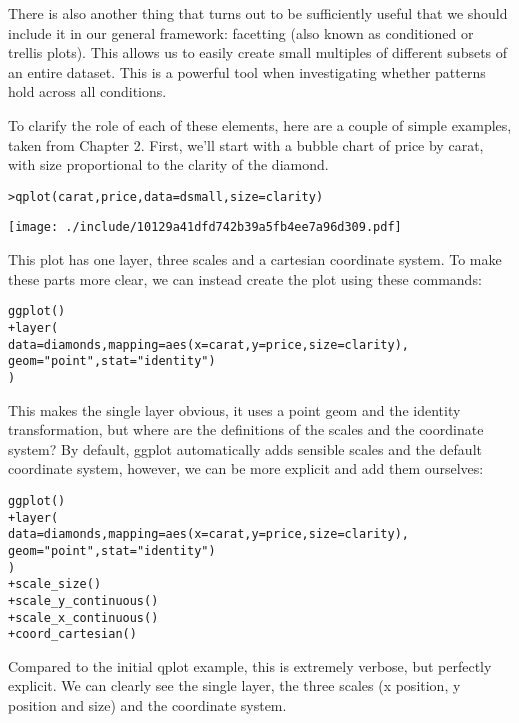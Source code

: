 There is also another thing that turns out to be sufficiently useful that we should include it in our general framework: facetting (also known as conditioned or trellis plots). This allows us to easily create small multiples of different subsets of an entire dataset. This is a powerful tool when investigating whether patterns hold across all conditions.

To clarify the role of each of these elements, here are a couple of simple examples, taken from Chapter 2.  First, we'll start with a bubble chart of price by carat, with size proportional to the clarity of the diamond.

\begin{alltt}
> qplot(carat, price, data = dsmall, size = clarity)
\end{alltt}
\texttt{[image: ./include/10129a41dfd742b39a5fb4ee7a96d309.pdf]}
\begin{alltt}

\end{alltt}

This plot has one layer, three scales and a cartesian coordinate system.  To make these parts more clear, we can instead create the plot using these commands:

\begin{alltt}
ggplot()
+ layer(
    data = diamonds, mapping = aes(x = carat, y = price, size = clarity),
    geom = "point", stat = "identity")
  )
\end{alltt}

This makes the single layer obvious, it uses a point geom and the identity transformation, but where are the definitions of the scales and the coordinate system?  By default, ggplot automatically adds sensible scales and the default coordinate system, however, we can be more explicit and add them ourselves:

\begin{alltt}
ggplot() 
+ layer(
    data = diamonds, mapping = aes(x = carat, y = price, size = clarity),
    geom = "point", stat = "identity")
  )
+ scale_size()
+ scale_y_continuous()
+ scale_x_continuous()
+ coord_cartesian()
\end{alltt}

Compared to the initial qplot example, this is extremely verbose, but perfectly explicit.  We  can clearly see the single layer, the three scales (x position, y position and size) and the coordinate system.  

